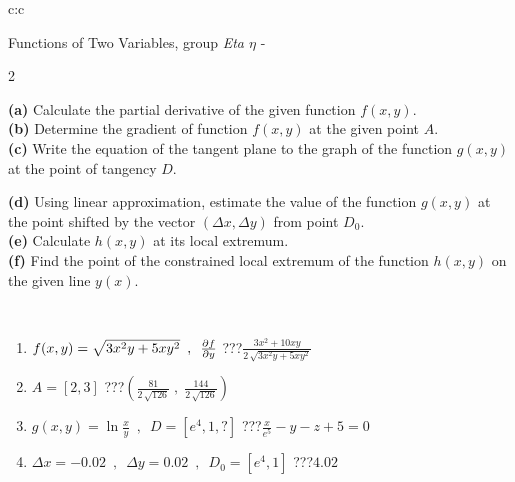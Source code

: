 \documentclass[10pt]{report}
\begin{document}
\begin{tabular}{c:c}
\begin{minipage}[c][104.5mm][t]{0.5\linewidth}
\begin{center}
\vspace{7mm}
{\huge \LARGE Functions of Two Variables, group \textit{Eta $\eta$} -}\\[5mm]
\begin{minipage}{0.95\linewidth}
\begin{center}
{\small \begin{multicols}{2} \raggedright
\textbf{(a)} Calculate the partial derivative of the given function \(f(x,y)\). \\[1mm]
\textbf{(b)} Determine the gradient of function \(f(x,y)\) at the given point \(A\). \\[1mm]
\textbf{(c)} Write the equation of the tangent plane to the graph of the function \(g(x,y)\) at the point of tangency \(D\). \par \columnbreak
\textbf{(d)} Using linear approximation, estimate the value of the function \(g(x,y)\) at the point shifted by the vector \((\Delta x, \Delta y)\) from point \(D_0\). \\[1mm]
\textbf{(e)} Calculate \(h(x,y)\) at its local extremum. \\[1mm]
\textbf{(f)} Find the point of the constrained local extremum of the function \(h(x,y)\) on the given line \(y(x)\). \\[1mm]
\end{multicols}
}
\end{center}
\end{minipage}
\\[4mm]
\begin{minipage}{0.79\linewidth}
\begin{center}
\begin{varwidth}{\linewidth}
\begin{enumerate}
\normalsizerr
\item $f(x,y) = \sqrt{3x^2y + 5xy^2}\enspace , \enspace \pdv{f}{y}$\quad \dotfill\; ???\;\dotfill \quad $\frac{3x^2+10xy}{2\,\sqrt{3x^2y+5xy^2}}$
\item $A = [2, 3]$\quad \dotfill\; ???\;\dotfill \quad $\left( \frac{81}{2\,\sqrt{126}} \;,\; \frac{144}{2\,\sqrt{126}} \right)$
\item $g(x,y) = \ln\frac{x}{y} \enspace , \enspace D=[e^{4},1,?]$\quad \dotfill\; ???\;\dotfill \quad $\frac{x}{e^5} - y - z + 5 = 0$
\item $\Delta x = {-0.02} \enspace,\enspace \Delta y = {0.02} \enspace,\enspace D_0 = [e^{4},1]$\quad \dotfill\; ???\;\dotfill \quad $4.02$

\end{enumerate}
\end{varwidth}
\end{center}
\end{minipage}
\end{center}
\end{minipage}
\end{tabular}
\end{document}
